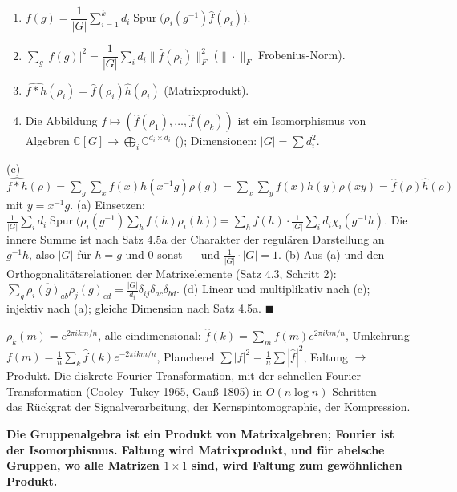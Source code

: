 \begin{merksatz}
\begin{enumerate}[label=(\alph*), leftmargin=1.6em]
\item $f(g) = \dfrac1{|G|}\sum_{i = 1}^{k}d_i\operatorname{Spur}\bigl(\rho_i(g^{-1})\hat f(\rho_i)\bigr)$.
\item $\sum_{g}|f(g)|^{2} = \dfrac1{|G|}\sum_id_i\|\hat f(\rho_i)\|_F^{2}$ ($\|\cdot\|_F$ Frobenius-Norm).
\item $\widehat{f * h}(\rho_i) = \hat f(\rho_i)\hat h(\rho_i)$ (Matrixprodukt).
\item Die Abbildung $f\mapsto(\hat f(\rho_1), \dots, \hat f(\rho_k))$ ist ein Isomorphismus von Algebren $\mathbb C[G]\to\bigoplus_i\mathbb C^{d_i\times d_i}$ (); Dimensionen: $|G| = \sum d_i^{2}$.
\end{enumerate}

(c) $\widehat{f * h}(\rho) = \sum_g\sum_xf(x)h(x^{-1}g)\rho(g) = \sum_x\sum_yf(x)h(y)\rho(xy) = \hat f(\rho)\hat h(\rho)$ mit $y = x^{-1}g$. (a) Einsetzen: $\frac1{|G|}\sum_id_i\operatorname{Spur}\bigl(\rho_i(g^{-1})\sum_hf(h)\rho_i(h)\bigr) = \sum_hf(h)\cdot\frac1{|G|}\sum_id_i\chi_i(g^{-1}h)$. Die innere Summe ist nach Satz 4.5a der Charakter der regulären Darstellung an $g^{-1}h$, also $|G|$ für $h = g$ und $0$ sonst --- und $\frac1{|G|}\cdot|G| = 1$. (b) Aus (a) und den Orthogonalitätsrelationen der Matrixelemente (Satz 4.3, Schritt 2): $\sum_g\overline{\rho_i(g)_{ab}}\rho_j(g)_{cd} = \frac{|G|}{d_i}\delta_{ij}\delta_{ac}\delta_{bd}$. (d) Linear und multiplikativ nach (c); injektiv nach (a); gleiche Dimension nach Satz 4.5a. $\blacksquare$

$\rho_k(m) = e^{2\pi ikm/n}$, alle eindimensional: $\hat f(k) = \sum_mf(m)e^{2\pi ikm/n}$, Umkehrung $f(m) = \frac1n\sum_k\hat f(k)e^{-2\pi ikm/n}$, Plancherel $\sum|f|^{2} = \frac1n\sum|\hat f|^{2}$, Faltung $\to$ Produkt. Die diskrete Fourier-Transformation, mit der schnellen Fourier-Transformation (Cooley--Tukey 1965, Gauß 1805) in $O(n\log n)$ Schritten --- das Rückgrat der Signalverarbeitung, der Kernspintomographie, der Kompression.

\begin{center}
\begin{minipage}{0.9\textwidth}
\textbf{Die Gruppenalgebra ist ein Produkt von Matrixalgebren; Fourier ist der Isomorphismus. Faltung wird Matrixprodukt, und für abelsche Gruppen, wo alle Matrizen $1\times1$ sind, wird Faltung zum gewöhnlichen Produkt.}
\end{minipage}
\end{center}


\end{merksatz}
